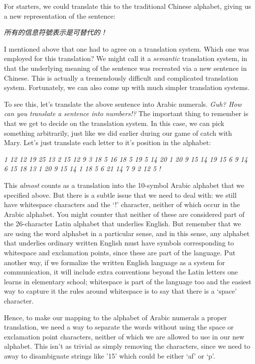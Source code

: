 \documentclass{book}
\begin{document}
For starters, we could translate this to the traditional Chinese alphabet, giving us a new representation of the sentence:

  \emph{所有的信息符號表示是可替代的！}

I mentioned above that one had to agree on a translation system.  Which one was employed for this translation? We might call it a \emph{semantic} translation system, in that the underlying meaning of the sentence was recreated via a new sentence in Chinese. This is actually a tremendously difficult and complicated translation system. Fortunately, we can also come up with much simpler translation systems.

To see this, let's translate the above sentence into Arabic numerals. \emph{Guh? How can you translate a sentence into numbers!?} The important thing to remember is that we get to decide on the translation system. In this case, we can pick something arbitrarily, just like we did earlier during our game of catch with Mary. Let's just translate each letter to it's position in the alphabet:

  \emph{1 12 12  19 25 13 2 15 12 9 3  18 5 16 18 5 19 5 14 20 1 20 9 15 14 19  15 6  9 14 6 15 18 13 1 20 9 15 14  1 18 5  6 21 14 7 9 2 12 5 !}

This \emph{almost} counts as a translation into the 10-symbol Arabic alphabet that we specified above. But there is a subtle issue that we need to deal with: we still have whitespace characters and the `!' character, neither of which occur in the Arabic alphabet. You might counter that neither of these are considered part of the 26-character Latin alphabet that underlies English. But remember that we are using the word alphabet in a particular sense, and in this sense, any alphabet that underlies ordinary written English must have symbols corresponding to whitespace and exclamation points, since these are part of the language. Put another way, if we formalize the written English language as a system for communication, it will include extra conventions beyond the Latin letters one learns in elementary school; whitespace is part of the language too and the easiest way to capture it the rules around whitespace is to say that there is a `space' character.

Hence, to make our mapping to the alphabet of Arabic numerals a proper translation, we need a way to separate the words without using the space or exclamation point characters, neither of which we are allowed to use in our new alphabet. This isn't as trivial as simply removing the characters, since we need to away to disambiguate strings like '15' which could be either `af' or `p'.
\end{document}
